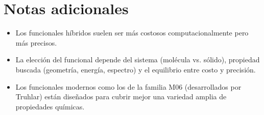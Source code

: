 \documentclass{article}
\begin{document}
\section{Notas adicionales}

\begin{itemize}
  \item Los funcionales híbridos suelen ser más costosos computacionalmente pero más precisos.
  \item La elección del funcional depende del sistema (molécula vs. sólido), propiedad buscada (geometría, energía, espectro) y el equilibrio entre costo y precisión.
  \item Los funcionales modernos como los de la familia M06 (desarrollados por Truhlar) están diseñados para cubrir mejor una variedad amplia de propiedades químicas.
\end{itemize}
\end{document}
